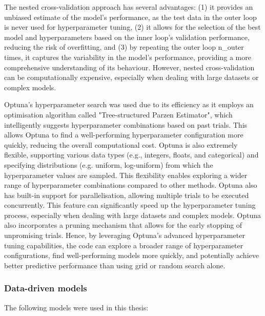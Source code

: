 The nested cross-validation approach has several advantages: (1) it provides an unbiased estimate of the model's performance, as the test data in the outer loop is never used for hyperparameter tuning, (2) it allows for the selection of the best model and hyperparameters based on the inner loop's validation performance, reducing the risk of overfitting, and (3) by repeating the outer loop n\_outer times, it captures the variability in the model's performance, providing a more comprehensive understanding of its behaviour. However, nested cross-validation can be computationally expensive, especially when dealing with large datasets or complex models.

Optuna's hyperparameter search was used due to its efficiency as it employs an optimisation algorithm called "Tree-structured Parzen Estimator", which intelligently suggests hyperparameter combinations based on past trials. This allows Optuna to find a well-performing hyperparameter configuration more quickly, reducing the overall computational cost. Optuna is also extremely flexible, supporting various data types (e.g., integers, floats, and categorical) and specifying distributions (e.g. uniform, log-uniform) from which the hyperparameter values are sampled. This flexibility enables exploring a wider range of hyperparameter combinations compared to other methods. Optuna also has built-in support for parallelisation, allowing multiple trials to be executed concurrently. This feature can significantly speed up the hyperparameter tuning process, especially when dealing with large datasets and complex models. Optuna also incorporates a pruning mechanism that allows for the early stopping of unpromising trials. Hence, by leveraging Optuna's advanced hyperparameter tuning capabilities, the code can explore a broader range of hyperparameter configurations, find well-performing models more quickly, and potentially achieve better predictive performance than using grid or random search alone.

\subsubsection{Data-driven models}
The following models were used in this thesis:

